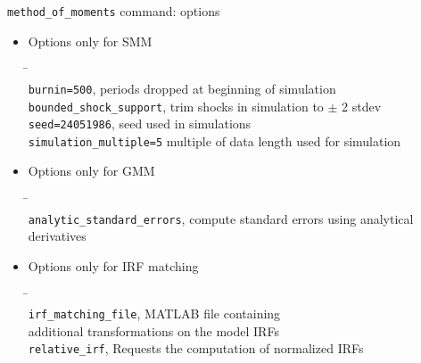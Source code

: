 \begin{frame}{\texttt{method\_of\_moments} command: options}

  \begin{itemize}
    \item Options only for SMM
          \begin{tabbing}
            \=\hspace*{5cm}\= \\
            \>\texttt{burnin=500}, \> periods dropped at beginning of simulation\\
            \>\texttt{bounded\_shock\_support},  \>trim shocks in simulation to $\pm$ 2 stdev\\
            \>\texttt{seed=24051986},           \> seed used in simulations\\
            \>\texttt{simulation\_multiple=5}     \> multiple of data length used for simulation
          \end{tabbing}
  \end{itemize}

  \begin{itemize}
    \item Options only for GMM
          \begin{tabbing}
            \=\hspace*{5cm}\= \\
            \>\texttt{analytic\_standard\_errors}, \> compute standard errors using
            analytical derivatives\\
          \end{tabbing}
  \end{itemize}
  \begin{itemize}
    \item Options only for IRF matching
          \begin{tabbing}
            \=\hspace*{5cm}\= \\
            \>\texttt{irf\_matching\_file}, \> MATLAB file containing\\ 
            \> \> additional transformations on the model IRFs\\
            \>\texttt{relative\_irf}, \> Requests the computation of normalized IRFs\\
          \end{tabbing}
  \end{itemize}
\end{frame}


